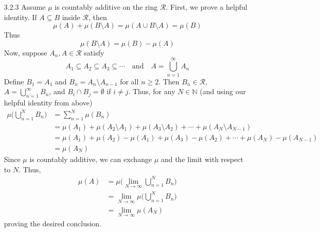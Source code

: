 \documentclass[../../Solutions.tex]{subfiles}
\begin{document}
\begin{itemize}
	\item [3.2.3] Assume $\mu$ is countably additive on the ring $\mathcal{R}$.
		First, we prove a helpful identity.
		If $A \subseteq B$ inside $\mathcal{R}$, then
		$$ \mu(A) + \mu(B\setminus A) = \mu(A \cup B\setminus A) = \mu(B) $$
		Thus
		$$ \mu(B\setminus A) = \mu(B) - \mu(A) $$
		Now, suppose $A_n, A \in \mathcal{R}$ satisfy
		$$ A_1 \subseteq A_2 \subseteq A_3 \subseteq \cdots \quad\text{and}\quad A = \bigcup_{n=1}^\infty A_n $$
		Define $B_1 = A_1$ and $B_n = A_n \setminus A_{n-1}$ for all $n \geq 2$.
		Then $B_n \in \mathcal{R}$, $A = \bigcup_{n=1}^\infty B_n$, and $B_i \cap B_j = \emptyset$ if $i \neq j$.
		Thus, for any $N \in \mathbb{N}$ (and using our helpful identity from above)
		\begin{equation*} \begin{split}
			\mu\Big(\bigcup_{n=1}^N B_n\Big) & = \sum_{n=1}^N \mu(B_n) \\
				& = \mu(A_1) + \mu(A_2 \setminus A_1) + \mu(A_3 \setminus A_2) + \cdots + \mu(A_N\setminus A_{N-1}) \\
				& = \mu(A_1) + \mu(A_2) - \mu(A_1) + \mu(A_3) - \mu(A_2) + \cdots + \mu(A_N) - \mu(A_{N-1}) \\
				& = \mu(A_N)
		\end{split} \end{equation*}
		Since $\mu$ is countably additive, we can exchange $\mu$ and the limit with respect to $N$.
		Thus,
		\begin{equation*} \begin{split}
			\mu(A) & = \mu\Big(\lim_{N\to\infty}\bigcup_{n=1}^N B_n\Big) \\
				& = \lim_{N\to\infty}\mu\Big(\bigcup_{n=1}^N B_n\Big) \\
				& = \lim_{N\to\infty}\mu(A_N)
		\end{split} \end{equation*}
		proving the desired conclusion.
	

\end{itemize}
\end{document}
